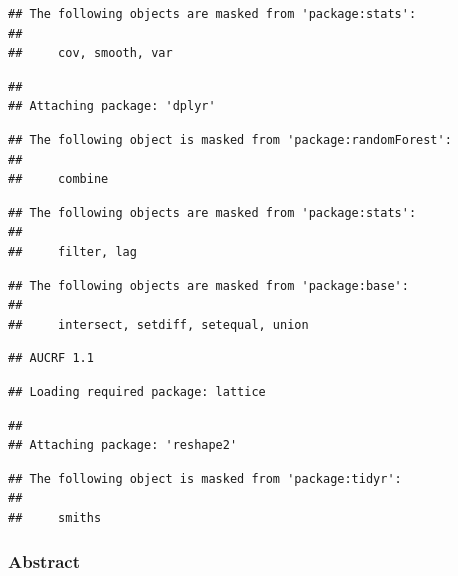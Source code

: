 \documentclass[11pt,]{article}
\begin{document}
\begin{verbatim}
## The following objects are masked from 'package:stats':
## 
##     cov, smooth, var
\end{verbatim}

\begin{verbatim}
## 
## Attaching package: 'dplyr'
\end{verbatim}

\begin{verbatim}
## The following object is masked from 'package:randomForest':
## 
##     combine
\end{verbatim}

\begin{verbatim}
## The following objects are masked from 'package:stats':
## 
##     filter, lag
\end{verbatim}

\begin{verbatim}
## The following objects are masked from 'package:base':
## 
##     intersect, setdiff, setequal, union
\end{verbatim}

\begin{verbatim}
## AUCRF 1.1
\end{verbatim}

\begin{verbatim}
## Loading required package: lattice
\end{verbatim}

\begin{verbatim}
## 
## Attaching package: 'reshape2'
\end{verbatim}

\begin{verbatim}
## The following object is masked from 'package:tidyr':
## 
##     smiths
\end{verbatim}

\subsubsection{Abstract}\label{abstract}
\end{document}
